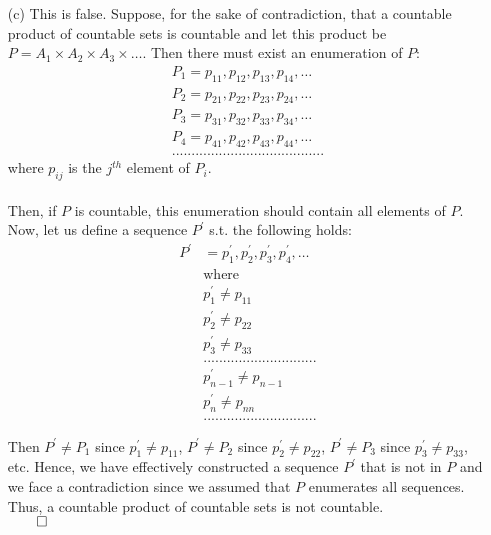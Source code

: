 \documentclass[11pt]{article}
\begin{document}
\begin{itemize}
\begin{itemize}
            \item[(c)]
                This is false. Suppose, for the sake of contradiction, that a
                countable product of countable sets is countable and let this
                product be $P = A_1 \times A_2 \times A_3 \times \dots$. Then
                there must exist an enumeration of $P$:
                \begin{align*}
                    P_1 = p_{11}, p_{12}, p_{13}, p_{14}, \dots\\
                    P_2 = p_{21}, p_{22}, p_{23}, p_{24}, \dots\\
                    P_3 = p_{31}, p_{32}, p_{33}, p_{34}, \dots\\
                    P_4 = p_{41}, p_{42}, p_{43}, p_{44}, \dots\\
                    .......................................
                \end{align*}
                where $p_{ij}$ is the $j^{th}$ element of $P_i$.
                \\
                \\
                Then, if $P$ is countable, this enumeration should contain all
                elements of $P$.
                \\
                Now, let us define a sequence $P^\prime$ s.t. the following
                holds:
                \begin{align*}
                    P^\prime &= p^\prime_1, p^\prime_2, p^\prime_3, p^\prime_4, \dots\\
                             &\text{where}\\
                             & p^\prime_1 \neq p_{11}\\
                             & p^\prime_2 \neq p_{22}\\
                             & p^\prime_3 \neq p_{33}\\
                             & .............................\\
                             & p^\prime_{n - 1} \neq p_{n - 1}\\
                             & p^\prime_n \neq p_{nn}\\
                             & .............................
                \end{align*}
                
                Then $P^\prime \neq P_1$ since $p^\prime_1 \neq p_{11}$,
                $P^\prime \neq P_2$ since $p^\prime_2 \neq p_{22}$, $P^\prime
                \neq P_3$ since $p^\prime_3 \neq p_{33}$, etc.  Hence, we have
                effectively constructed a sequence $P^\prime$ that is not in
                $P$ and we face a contradiction since we assumed that $P$
                enumerates all sequences. Thus, a countable product of
                countable sets is not countable.\\
                $\qed$
        \end{itemize}


\end{itemize}
\end{document}
